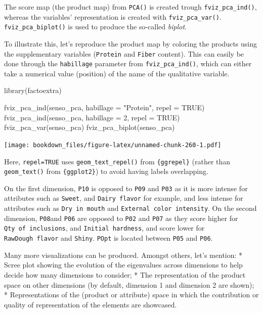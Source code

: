 \documentclass[
]{krantz}
\makeatletter
\newenvironment{Shaded}{\begin{snugshade}}{\end{snugshade}}
\newcommand{\AttributeTok}[1]{\textcolor[rgb]{0.61,0.61,0.61}{#1}}
\newcommand{\ConstantTok}[1]{\textcolor[rgb]{0,0,0}{#1}}
\newcommand{\DecValTok}[1]{\textcolor[rgb]{0.06,0.06,0.06}{#1}}
\newcommand{\FunctionTok}[1]{\textcolor[rgb]{0,0,0}{#1}}
\newcommand{\NormalTok}[1]{#1}
\newcommand{\StringTok}[1]{\textcolor[rgb]{0.5,0.5,0.5}{#1}}
\renewenvironment{quote}{\begin{VF}}{\end{VF}}
\newenvironment{kframe}{%
\medskip{}
\setlength{\fboxsep}{.8em}
 \def\at@end@of@kframe{}%
 \ifinner\ifhmode%
  \def\at@end@of@kframe{\end{minipage}}%
  \begin{minipage}{\columnwidth}%
 \fi\fi%
 \def\FrameCommand##1{\hskip\@totalleftmargin \hskip-\fboxsep
 \colorbox{shadecolor}{##1}\hskip-\fboxsep
     \hskip-\linewidth \hskip-\@totalleftmargin \hskip\columnwidth}%
 \MakeFramed {\advance\hsize-\width
   \@totalleftmargin\z@ \linewidth\hsize
   \@setminipage}}%
 {\par\unskip\endMakeFramed%
 \at@end@of@kframe}
\renewenvironment{Shaded}{\begin{kframe}}{\end{kframe}}
\makeatother
\begin{document}
The score map (the product map) from \texttt{PCA()} is created trough \texttt{fviz\_pca\_ind()}, whereas the variables' representation is created with \texttt{fviz\_pca\_var()}. \texttt{fviz\_pca\_biplot()} is used to produce the so-called \emph{biplot}.

To illustrate this, let's reproduce the product map by coloring the products using the supplementary variables (\texttt{Protein} and \texttt{Fiber} content). This can easily be done through the \texttt{habillage} parameter from \texttt{fviz\_pca\_ind()}, which can either take a numerical value (position) of the name of the qualitative variable.

\begin{Shaded}
\begin{Highlighting}[]
\FunctionTok{library}\NormalTok{(factoextra)}

\FunctionTok{fviz\_pca\_ind}\NormalTok{(senso\_pca, }\AttributeTok{habillage =} \StringTok{"Protein"}\NormalTok{, }\AttributeTok{repel =} \ConstantTok{TRUE}\NormalTok{)}
\FunctionTok{fviz\_pca\_ind}\NormalTok{(senso\_pca, }\AttributeTok{habillage =} \DecValTok{2}\NormalTok{, }\AttributeTok{repel =} \ConstantTok{TRUE}\NormalTok{)}
\FunctionTok{fviz\_pca\_var}\NormalTok{(senso\_pca)}
\FunctionTok{fviz\_pca\_biplot}\NormalTok{(senso\_pca)}
\end{Highlighting}
\end{Shaded}

\texttt{[image: bookdown\_files/figure-latex/unnamed-chunk-260-1.pdf]}

Here, \texttt{repel=TRUE} uses \texttt{geom\_text\_repel()} from \texttt{\{ggrepel\}} (rather than \texttt{geom\_text()} from \texttt{\{ggplot2\}}) to avoid having labels overlapping.

On the first dimension, \texttt{P10} is opposed to \texttt{P09} and \texttt{P03} as it is more intense for attributes such as \texttt{Sweet}, and \texttt{Dairy\ flavor} for example, and less intense for attributes such as \texttt{Dry\ in\ mouth} and \texttt{External\ color\ intensity}. On the second dimension, \texttt{P08}and \texttt{P06} are opposed to \texttt{P02} and \texttt{P07} as they score higher for \texttt{Qty\ of\ inclusions}, and \texttt{Initial\ hardness}, and score lower for \texttt{RawDough\ flavor} and \texttt{Shiny}. \texttt{POpt} is located between \texttt{P05} and \texttt{P06}.

\begin{quote}
Many more visualizations can be produced. Amongst others, let's mention:
* Scree plot showing the evolution of the eigenvalues across dimensions to help decide how many dimensions to consider;
* The representation of the product space on other dimensions (by default, dimension 1 and dimension 2 are shown);
* Representations of the (product or attribute) space in which the contribution or quality of representation of the elements are showcased.
\end{quote}
\end{document}
